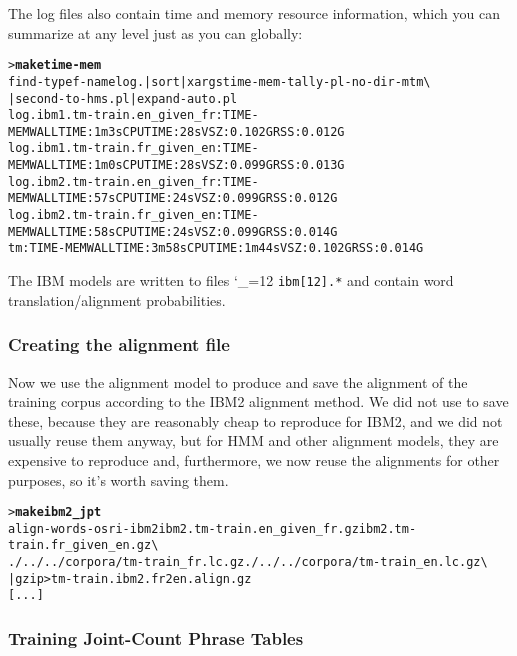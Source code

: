 \documentclass[11pt,letterpaper]{article}
\newcommand{\bs}{\textbackslash{}}
\def\code{\begingroup\catcode`\_=12 \codex}
\newcommand{\codex}[1]{\texttt{#1}\endgroup}
\begin{document}
The log files also contain time and memory resource information, which you can
summarize at any level just as you can globally:
\begin{footnotesize}
\begin{alltt}
   > \textbf{make time-mem}
   find -type f -name log.\* | sort | xargs time-mem-tally-pl -no-dir -m tm \bs
      | second-to-hms.pl | expand-auto.pl
      log.ibm1.tm-train.en_given_fr:TIME-MEM  WALL TIME: 1m3s   CPU TIME: 28s   VSZ: 0.102G  RSS: 0.012G
      log.ibm1.tm-train.fr_given_en:TIME-MEM  WALL TIME: 1m0s   CPU TIME: 28s   VSZ: 0.099G  RSS: 0.013G
      log.ibm2.tm-train.en_given_fr:TIME-MEM  WALL TIME: 57s    CPU TIME: 24s   VSZ: 0.099G  RSS: 0.012G
      log.ibm2.tm-train.fr_given_en:TIME-MEM  WALL TIME: 58s    CPU TIME: 24s   VSZ: 0.099G  RSS: 0.014G
   tm:TIME-MEM                                WALL TIME: 3m58s  CPU TIME: 1m44s VSZ: 0.102G  RSS: 0.014G
\end{alltt}
\end{footnotesize}

The IBM models are written to files \code{ibm[12].*} and contain word
translation/alignment probabilities.

\subsubsection*{Creating the alignment file}

Now we use the alignment model to produce and save the alignment of the
training corpus according to the IBM2 alignment method.  We did not use to save
these, because they are reasonably cheap to reproduce for IBM2, and we did not
usually reuse them anyway, but for HMM and other alignment models, they are
expensive to reproduce and, furthermore, we now reuse the alignments for other
purposes, so it's worth saving them.

\begin{small}
\begin{alltt}
   > \textbf{make ibm2_jpt}
   align-words -o sri -ibm 2 ibm2.tm-train.en_given_fr.gz  ibm2.tm-train.fr_given_en.gz \bs
      ./../../corpora/tm-train_fr.lc.gz ./../../corpora/tm-train_en.lc.gz \bs
      | gzip > tm-train.ibm2.fr2en.align.gz
   [...]
\end{alltt}
\end{small}

\subsubsection*{Training Joint-Count Phrase Tables}
\end{document}
